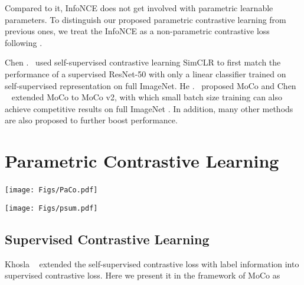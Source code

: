 \documentclass[10pt,twocolumn,letterpaper]{article}
\begin{document}
Compared to it, InfoNCE does not get involved with parametric learnable parameters.
To distinguish our proposed parametric contrastive learning from previous ones, we treat the InfoNCE as a non-parametric contrastive loss following \cite{wu2018unsupervised}.

Chen \etal.~\cite{DBLP:conf/icml/ChenK0H20} used self-supervised contrastive learning SimCLR to first match the performance of a supervised ResNet-50 with only a linear classifier trained on self-supervised representation on full ImageNet.
He \etal.~\cite{DBLP:conf/cvpr/He0WXG20} proposed MoCo and Chen \etal~\cite{DBLP:journals/corr/abs-2003-04297} extended MoCo to MoCo v2, with which small batch size training can also achieve competitive results on full ImageNet \cite{imagenet}.
In addition, many other methods \cite{DBLP:conf/nips/GrillSATRBDPGAP20, DBLP:conf/nips/CaronMMGBJ20} are also proposed to further boost performance. 

\section{Parametric Contrastive Learning}
\begin{figure*}[t]
	\begin{minipage}{.616\linewidth}
		\centering
		\texttt{[image: Figs/PaCo.pdf]}
		~\label{fig:PaCo_framework}
	\end{minipage}
	\vspace{.1in}
	\begin{minipage}{.38\linewidth}
		\centering
		\texttt{[image: Figs/psum.pdf]}
		\label{fig:psum}
	\end{minipage}
\end{figure*}

\subsection{Supervised Contrastive Learning}
\label{Sec:supcon}

Khosla \etal~\cite{DBLP:conf/nips/KhoslaTWSTIMLK20} extended the self-supervised contrastive loss with label information into supervised contrastive loss. Here we present it in the framework of MoCo \cite{DBLP:conf/cvpr/He0WXG20, DBLP:journals/corr/abs-2003-04297} as
\end{document}

